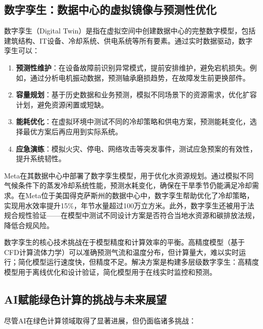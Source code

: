 \subsection{数字孪生：数据中心的虚拟镜像与预测性优化}

数字孪生（Digital Twin）是指在虚拟空间中创建数据中心的完整数字模型，包括建筑结构、IT设备、冷却系统、供电系统等所有要素。通过实时数据驱动，数字孪生可以：

\begin{enumerate}
    \item \textbf{预测性维护}：在设备故障前识别异常模式，提前安排维护，避免宕机损失。例如，通过分析电机振动数据，预测轴承磨损趋势，在故障发生前更换部件。

    \item \textbf{容量规划}：基于历史数据和业务预测，模拟不同场景下的资源需求，优化扩容计划，避免资源闲置或短缺。

    \item \textbf{能耗优化}：在虚拟环境中测试不同的冷却策略和供电方案，预测能耗变化，选择最优方案后再应用到实际系统。

    \item \textbf{应急演练}：模拟火灾、停电、网络攻击等突发事件，测试应急预案的有效性，提升系统韧性。
\end{enumerate}

Meta在其数据中心中部署了数字孪生模型，用于优化水资源规划。通过模拟不同气候条件下的蒸发冷却系统性能，预测水耗变化，确保在干旱季节仍能满足冷却需求。在Meta位于美国得克萨斯州的数据中心中，数字孪生帮助优化了冷却策略，实现用水效率提升15\%，年节水量超过100万立方米。此外，数字孪生还被用于法规合规性验证——在模型中测试不同设计方案是否符合当地水资源和碳排放法规，降低合规风险。

数字孪生的核心技术挑战在于模型精度和计算效率的平衡。高精度模型（基于CFD计算流体力学）可以准确预测气流和温度分布，但计算量大，难以实时运行；简化模型运行速度快，但精度不足。解决方案是构建多层级数字孪生：高精度模型用于离线优化和设计验证，简化模型用于在线实时监控和预测。

\subsection{AI赋能绿色计算的挑战与未来展望}

尽管AI在绿色计算领域取得了显著进展，但仍面临诸多挑战：

